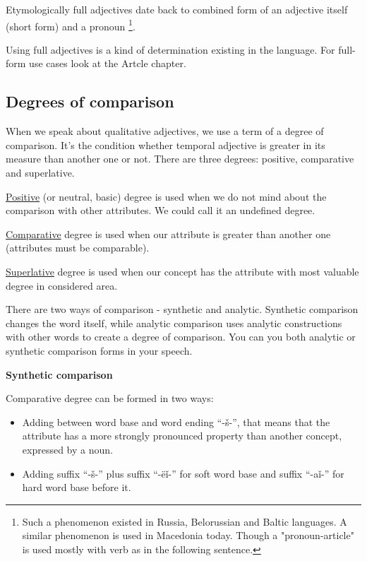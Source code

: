 Etymologically full adjectives date back to combined form of an adjective itself (short form) and a pronoun \footnote{Such a phenomenon existed in Russia, Belorussian and Baltic languages. A similar phenomenon is used in Macedonia today. Though a "pronoun-article" is used mostly with verb as in the following sentence.}. 

Using full adjectives is a kind of determination existing in the language. For full-form use cases look at the Artcle chapter.

\subsection{Degrees of comparison}

When we speak about qualitative adjectives, we use a term of a degree of comparison. It’s the condition whether temporal adjective is greater in its measure than another one or not. There are three degrees: positive, comparative and superlative.

\underline{Positive} (or neutral, basic) degree is used when we do not mind about the comparison with other attributes. We could call it an undefined degree.

\underline{Comparative} degree is used when our attribute is greater than another one (attributes must be comparable).  

\underline{Superlative} degree is used when our concept has the attribute with most valuable degree in considered area.

There are two ways of comparison - synthetic and analytic. Synthetic comparison changes the word itself, while analytic comparison uses analytic constructions with other words to create a degree of comparison. You can you both analytic or synthetic comparison forms in your speech.

\textbf{Synthetic comparison}

Comparative degree can be formed in two ways: 

\begin{itemize}
	\item Adding between word base and word ending “-š-”, that means that the attribute has a more strongly pronounced property than another concept, expressed by a noun.
	\item Adding suffix “-š-” plus suffix “-ëǐ-” for soft word base and suffix “-aǐ-” for hard word base before it.
\end{itemize}

